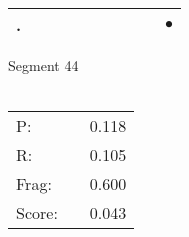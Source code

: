 \documentclass[landscape]{article}
\newcommand{\ssp}{\hspace{2pt}}
\newcommand{\mex}{\cellcolor{g}$\bullet$}
\begin{document}
\begin{tabular}{|l|p{10pt}|p{10pt}|p{10pt}|p{10pt}|p{10pt}|p{10pt}|p{10pt}|p{10pt}|p{10pt}|}
\hline
\ssp \cellcolor{ref8}. \ssp&\hspace{2pt}&\hspace{2pt}&\hspace{2pt}&\hspace{2pt}&\hspace{2pt}&\hspace{2pt}&\hspace{2pt}&\hspace{2pt}&\hspace{2pt}\mex\\
\hline
\end{tabular}

\vspace{6pt}
\noindent Segment 44\\\\
\noindent\begin{tabular}{lm{12pt}r}
\hline
P:&&0.118\\
R:&&0.105\\
Frag:&&0.600\\
Score:&&0.043\\
\end{tabular}

\newpage
\end{document}
